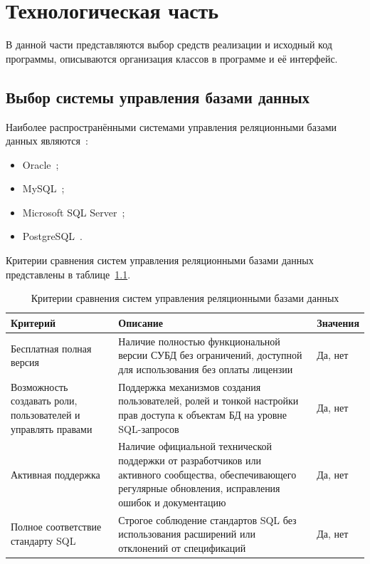 \chapter{Технологическая часть}

В данной части представляются выбор средств реализации и исходный код программы, описываются организация классов в программе и её интерфейс.

\section{Выбор системы управления базами данных}

Наиболее распространёнными системами управления реляционными базами данных являются~\cite{lit11}:
\begin{itemize}[label=--]
	\item Oracle~\cite{lit12};
	\item MySQL~\cite{lit13};
	\item Microsoft SQL Server~\cite{lit14};
	\item PostgreSQL~\cite{lit15}.
\end{itemize}

Критерии сравнения систем управления реляционными базами данных представлены в таблице~\ref{tbl:subd-criteria}.

\begin{table}[h]
	\centering
	\caption{Критерии сравнения систем управления реляционными базами данных}
	\label{tbl:subd-criteria}
	\begin{tabularx}{\textwidth}{|p{3.5cm}|X|p{2.1cm}|}
		\hline
		\textbf{Критерий} & \textbf{Описание} & \textbf{Значения} \\
		\hline
		Бесплатная полная версия & Наличие полностью функциональной версии СУБД без ограничений, доступной для использования без оплаты лицензии & Да, нет \\
		\hline
		Возможность создавать роли, пользователей и управлять правами & Поддержка механизмов создания пользователей, ролей и тонкой настройки прав доступа к объектам БД на уровне SQL-запросов & Да, нет \\
		\hline
		Активная поддержка & Наличие официальной технической поддержки от разработчиков или активного сообщества, обеспечивающего регулярные обновления, исправления ошибок и документацию & Да, нет \\
		\hline
		Полное соответствие стандарту SQL & Строгое соблюдение стандартов SQL без использования расширений или отклонений от спецификаций & Да, нет \\
		\hline
	\end{tabularx}
\end{table}

